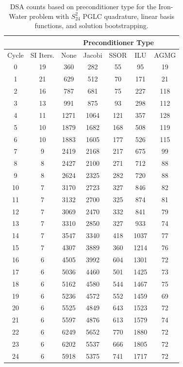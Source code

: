 \begin{table}
\caption{DSA counts based on preconditioner type for the Iron-Water problem with $S_{24}^2$ PGLC quadrature, linear basis functions, and solution bootstrapping.}
\begin{center}
\def\arraystretch{1.25}
\begin{tabular}{|c|c|c|c|c|c|c|}
\hline
& & \multicolumn{5}{c}{Preconditioner Type}\vline\\
\hline
Cycle & SI Iters. & None&Jacobi&SSOR& ILU& AGMG \\
\hline
0&19&360&282&55&95&19\\
1&21&629&512&70&171&21\\
2&16&787&681&75&227&118\\
3&13&991&875&93&298&112\\
4&11&1271&1064&121&357&128\\
5&10&1879&1682&168&508&119\\
6&10&1883&1605&177&526&115\\
7&9&2419&2168&217&675&99\\
8&8&2427&2100&271&712&88\\
9&8&2624&2325&282&720&88\\
10&7&3170&2723&327&846&82\\
11&7&3132&2700&325&874&81\\
12&7&3069&2470&332&841&79\\
13&7&3310&2850&327&933&74\\
14&7&3547&3340&418&1037&77\\
15&7&4307&3889&360&1214&76\\
16&6&4505&3992&604&1301&72\\
17&6&5036&4460&501&1425&73\\
18&6&5162&4580&544&1467&75\\
19&6&5236&4572&552&1459&69\\
20&6&5525&4849&643&1523&72\\
21&6&5597&4876&613&1579&74\\
22&6&6249&5652&770&1880&72\\
23&6&6202&5537&666&1805&72\\
24&6&5918&5375&741&1717&72\\
\hline
\end{tabular}
\end{center}
\label{tab::DSA_IW_PGLC24_k1_boot}
\end{table}

